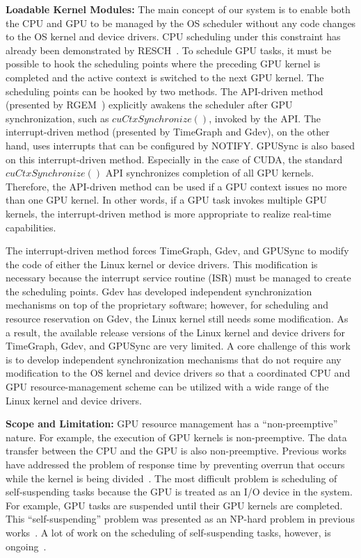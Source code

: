 \textbf{Loadable Kernel Modules:}
 The main concept of our system is to enable both the CPU and GPU to be managed by the OS scheduler without any code changes to the OS kernel and device drivers.
CPU scheduling under this constraint has already been demonstrated by RESCH~\cite{kato2009loadable, asberg2012exsched}.
To schedule GPU tasks, it must be possible to hook the scheduling points where the preceding GPU kernel is completed and the active context is switched to the next GPU kernel.
The scheduling points can be hooked by two methods.
The API-driven method (presented by RGEM~\cite{kato:rgem}) explicitly awakens the scheduler after GPU synchronization, such as $cuCtxSynchronize()$, invoked by the API.
The interrupt-driven method (presented by TimeGraph and Gdev), on the other hand, uses interrupts that can be configured by NOTIFY.
GPUSync is also based on this interrupt-driven method.
Especially in the case of CUDA, the standard $cuCtxSynchronize()$ API synchronizes completion of all GPU kernels.
Therefore, the API-driven method can be used if a GPU context issues no more than one GPU kernel.
In other words, if a GPU task invokes multiple GPU kernels, the interrupt-driven method is more appropriate to realize real-time capabilities.


The interrupt-driven method forces TimeGraph, Gdev, and GPUSync to modify the code of either the Linux kernel or device drivers.
This modification is necessary because the interrupt service routine (ISR) must be managed to create the scheduling points.
Gdev has developed independent synchronization mechanisms on top of the proprietary software; however, for scheduling and resource reservation on Gdev, the Linux kernel still needs some modification.
As a result, the available release versions of the Linux kernel and device drivers for TimeGraph, Gdev, and GPUSync are very limited.
A core challenge of this work is to develop independent synchronization mechanisms that do not require any modification to the OS kernel and device drivers so that a coordinated CPU and GPU resource-management scheme can be utilized with a wide range of the Linux kernel and device drivers.

\textbf{Scope and Limitation:} 
GPU resource management has a ``non-preemptive'' nature.
For example, the execution of GPU kernels is non-preemptive.
The data transfer between the CPU and the GPU is also non-preemptive.
Previous works have addressed the problem of response time by preventing overrun that occurs while the kernel is being divided~\cite{basaran:preemptive,sparc}.
The most difficult problem is scheduling of self-suspending tasks because the GPU is treated as an I/O device in the system.
For example, GPU tasks are suspended until their GPU kernels are completed.
This ``self-suspending'' problem was presented as an NP-hard problem in previous works~\cite{self-sus:1,self-sus:2}.
A lot of work on the scheduling of self-suspending tasks, however, is ongoing~\cite{chattopadhyay2014limited,kim2013segment}.


